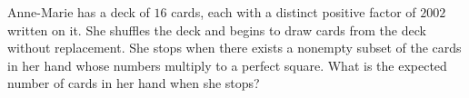 Anne-Marie has a deck of $16$ cards, each with a distinct positive factor of $2002$ written on it. She shuffles the deck and begins to draw cards from the deck without replacement. She stops when there exists a nonempty subset of the cards in her hand whose numbers multiply to a perfect square. What is the expected number of cards in her hand when she stops?